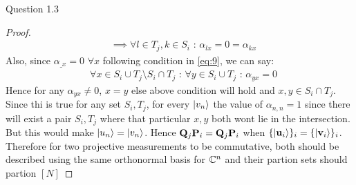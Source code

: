 \begin{solution}{Question 1.3}
\begin{proof}
\begin{equation}
\begin{split}
            &\implies \forall l\in T_j, k \in S_i \text{ : } \alpha_{lx} = 0 =\alpha_{kx}
        \end{split}
    \end{equation}
    Also, since $\alpha_{\_x} = 0$ $\forall x$ following condition in \ref{eq:9}, we can say:
    \begin{equation}
        \begin{split}
            &\forall x\in S_i\cup T_j \setminus S_i\cap T_j \text{ : }\forall y \in S_i\cup T_j \text{ : } \alpha_{yx} = 0
        \end{split}
    \end{equation}
    Hence for any $\alpha_{yx} \neq 0$, $x=y$ else above condition will hold and $x,y \in S_i \cap T_j$. Since thi is true for any set $S_i, T_j$, for every $\ket{v_n}$ the value of $\alpha_{n,n} = 1$ since there will exist a pair $S_i, T_j$ where that particular $x,y$ both wont lie in the intersection. But this would make $\ket{u_n}=\ket{v_n}$. Hence $\mathbf{Q}_j\mathbf{P}_i = \mathbf{Q}_j\mathbf{P}_i$ when $\{\ket{\mathbf{u}_i}\}_i = \{\ket{\mathbf{v}_i}\}_i$. \\
    
    Therefore for two projective measurements to be commutative, both should be described using the same orthonormal basis for $\mathbb{C}^n$ and their partion sets should partion $[N]$
    \end{proof}
\end{solution}
